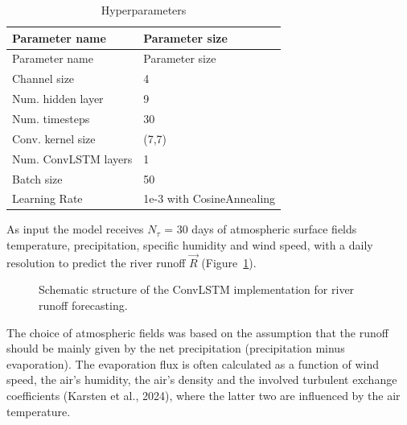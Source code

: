 \documentclass[
]{agujournal2019}
\begin{document}
\begin{longtable}[]{@{}ll@{}}
\caption{Hyperparameters}\label{tbl-letters}\tabularnewline
\toprule\noalign{}
Parameter name & Parameter size \\
\midrule\noalign{}
\endfirsthead
\toprule\noalign{}
Parameter name & Parameter size \\
\midrule\noalign{}
\endhead
\bottomrule\noalign{}
\endlastfoot
Channel size & 4 \\
Num. hidden layer & 9 \\
Num. timesteps & 30 \\
Conv. kernel size & (7,7) \\
Num. ConvLSTM layers & 1 \\
Batch size & 50 \\
Learning Rate & 1e-3 with CosineAnnealing \\
\end{longtable}

As input the model receives \(N_{\tau}\) = 30 days of atmospheric
surface fields temperature, precipitation, specific humidity and wind
speed, with a daily resolution to predict the river runoff \(\vec{R}\)
(Figure~\ref{fig-baltNet}).

\begin{figure}


\caption{\label{fig-baltNet}Schematic structure of the ConvLSTM
implementation for river runoff forecasting.}

\end{figure}%

The choice of atmospheric fields was based on the assumption that the
runoff should be mainly given by the net precipitation (precipitation
minus evaporation). The evaporation flux is often calculated as a
function of wind speed, the air's humidity, the air's density and the
involved turbulent exchange coefficients (Karsten et al., 2024), where
the latter two are influenced by the air temperature.
\end{document}
